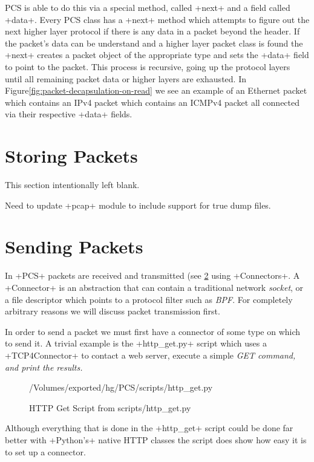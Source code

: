 \documentclass[11pt]{article}
\begin{document}
PCS is able to do this via a special method, called \method+next+ and
a field called \field+data+.  Every PCS class has a \method+next+
method which attempts to figure out the next higher layer protocol if
there is any data in a packet beyond the header.  If the packet's data
can be understand and a higher layer packet class is found the
\method+next+ creates a packet object of the appropriate type and
sets the \field+data+ field to point to the packet.  This process is
recursive, going up the protocol layers until all remaining packet
data or higher layers are exhausted.  In
Figure\ref{fig:packet-decapsulation-on-read} we see an example of an
Ethernet packet which contains an IPv4 packet which contains an ICMPv4
packet all connected via their respective \field+data+ fields.

\section{Storing Packets}

This section intentionally left blank.

Need to update \program+pcap+ module to include support for true dump
files.

\section{Sending Packets}
\label{sec:sending-packets}

In \program+PCS+ packets are received and transmitted (see
\ref{sec:sending-packets} using \class+Connectors+.  A
\class+Connector+ is an abstraction that can contain a traditional
network \emph{socket}, or a file descriptor which points to a protocol
filter such as \emph{BPF}.  For completely arbitrary reasons we will
discuss packet transmission first.

In order to send a packet we must first have a connector of some type
on which to send it.  A trivial example is the \file+http\_get.py+
script which uses a \class+TCP4Connector+ to contact a web server,
execute a simple \em{GET} command, and print the results.

\begin{figure}
  \centering
{/Volumes/exported/hg/PCS/scripts/http_get.py}
  \caption{HTTP Get Script from scripts/http\_get.py}
  \label{fig:http-get-script}
\end{figure}

Although everything that is done in the \program+http\_get+ script
could be done far better with \program+Python's+ native HTTP classes
the script does show how easy it is to set up a connector.
\end{document}
